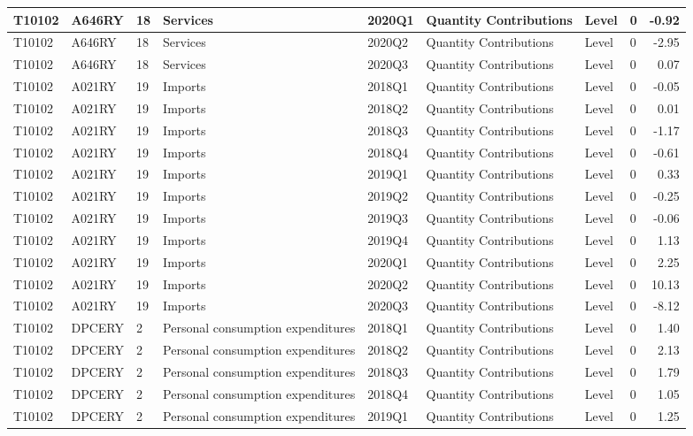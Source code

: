 \documentclass[
]{article}
\begin{document}
\begin{tabular}{l|l|l|l|l|l|l|l|r}
\hline
T10102 & A646RY & 18 & Services & 2020Q1 & Quantity Contributions & Level & 0 & -0.92\\
\hline
T10102 & A646RY & 18 & Services & 2020Q2 & Quantity Contributions & Level & 0 & -2.95\\
\hline
T10102 & A646RY & 18 & Services & 2020Q3 & Quantity Contributions & Level & 0 & 0.07\\
\hline
T10102 & A021RY & 19 & Imports & 2018Q1 & Quantity Contributions & Level & 0 & -0.05\\
\hline
T10102 & A021RY & 19 & Imports & 2018Q2 & Quantity Contributions & Level & 0 & 0.01\\
\hline
T10102 & A021RY & 19 & Imports & 2018Q3 & Quantity Contributions & Level & 0 & -1.17\\
\hline
T10102 & A021RY & 19 & Imports & 2018Q4 & Quantity Contributions & Level & 0 & -0.61\\
\hline
T10102 & A021RY & 19 & Imports & 2019Q1 & Quantity Contributions & Level & 0 & 0.33\\
\hline
T10102 & A021RY & 19 & Imports & 2019Q2 & Quantity Contributions & Level & 0 & -0.25\\
\hline
T10102 & A021RY & 19 & Imports & 2019Q3 & Quantity Contributions & Level & 0 & -0.06\\
\hline
T10102 & A021RY & 19 & Imports & 2019Q4 & Quantity Contributions & Level & 0 & 1.13\\
\hline
T10102 & A021RY & 19 & Imports & 2020Q1 & Quantity Contributions & Level & 0 & 2.25\\
\hline
T10102 & A021RY & 19 & Imports & 2020Q2 & Quantity Contributions & Level & 0 & 10.13\\
\hline
T10102 & A021RY & 19 & Imports & 2020Q3 & Quantity Contributions & Level & 0 & -8.12\\
\hline
T10102 & DPCERY & 2 & Personal consumption expenditures & 2018Q1 & Quantity Contributions & Level & 0 & 1.40\\
\hline
T10102 & DPCERY & 2 & Personal consumption expenditures & 2018Q2 & Quantity Contributions & Level & 0 & 2.13\\
\hline
T10102 & DPCERY & 2 & Personal consumption expenditures & 2018Q3 & Quantity Contributions & Level & 0 & 1.79\\
\hline
T10102 & DPCERY & 2 & Personal consumption expenditures & 2018Q4 & Quantity Contributions & Level & 0 & 1.05\\
\hline
T10102 & DPCERY & 2 & Personal consumption expenditures & 2019Q1 & Quantity Contributions & Level & 0 & 1.25\\

\end{tabular}
\end{document}
